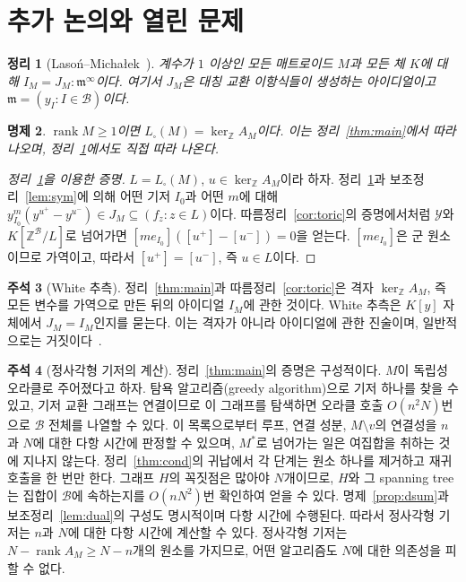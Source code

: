 \documentclass[11pt,a4paper]{article}
\newcommand{\lstroke}{{\lmfont ł}}
\theoremstyle{plain}
\newtheorem{theorem}{정리}[section]
\newtheorem{proposition}[theorem]{명제}
\theoremstyle{definition}
\newtheorem{remark}[theorem]{주석}
\newcommand{\Z}{\mathbb Z}
\newcommand{\AM}{A_M}
\newcommand{\kerZ}{\ker_{\Z}\!A_M}
\newcommand{\sq}{L_{\square}}
\newcommand{\bs}{\mathcal B}
\newcommand{\rank}{\operatorname{rank}}
\newcommand{\LM}{Lasoń--Micha\lstroke{}ek}
\begin{document}
\section{추가 논의와 열린 문제}\label{sec:caveats}
\begin{theorem}[\LM{}~\cite{LM14}]\label{thm:sat}
계수가 $1$ 이상인 모든 매트로이드 $M$과 모든 체 $K$에 대해 $I_M=J_M:\mathfrak m^\infty$이다. 여기서 $J_M$은 대칭 교환 이항식들이 생성하는 아이디얼이고 $\mathfrak m=(y_I:I\in\bs)$이다.
\end{theorem}

\begin{proposition}\label{prop:lattice}
$\rank M\ge1$이면 $\sq(M)=\kerZ$이다. 이는 정리~\ref{thm:main}에서 따라 나오며, 정리~\ref{thm:sat}에서도 직접 따라 나온다.
\end{proposition}
\begin{proof}[정리~\ref{thm:sat}을 이용한 증명]
$L=\sq(M)$, $u\in\kerZ$이라 하자. 정리~\ref{thm:sat}과 보조정리~\ref{lem:sym}에 의해 어떤 기저 $I_0$과 어떤 $m$에 대해 $y_{I_0}^{m}(y^{u^+}-y^{u^-})\in J_M\subseteq(f_z:z\in L)$이다. 따름정리~\ref{cor:toric}의 증명에서처럼 $\mathcal Y$와 $K[\Z^{\bs}/L]$로 넘어가면 $[me_{I_0}]([u^+]-[u^-])=0$을 얻는다. $[me_{I_0}]$은 군 원소이므로 가역이고, 따라서 $[u^+]=[u^-]$, 즉 $u\in L$이다.
\end{proof}

\begin{remark}[White 추측]\label{rem:white}
정리~\ref{thm:main}과 따름정리~\ref{cor:toric}은 격자 $\kerZ$, 즉 모든 변수를 가역으로 만든 뒤의 아이디얼 $I_M$에 관한 것이다. White 추측은 $K[y]$ 자체에서 $J_M=I_M$인지를 묻는다. 이는 격자가 아니라 아이디얼에 관한 진술이며, 일반적으로는 거짓이다~\cite{Lar26}.
\end{remark}

\begin{remark}[정사각형 기저의 계산]\label{rem:alg}
정리~\ref{thm:main}의 증명은 구성적이다. $M$이 독립성 오라클로 주어졌다고 하자. 탐욕 알고리즘(greedy algorithm)으로 기저 하나를 찾을 수 있고, 기저 교환 그래프는 연결이므로 이 그래프를 탐색하면 오라클 호출 $O(n^2N)$번으로 $\bs$ 전체를 나열할 수 있다. 이 목록으로부터 루프, 연결 성분, $M\setminus v$의 연결성을 $n$과 $N$에 대한 다항 시간에 판정할 수 있으며, $M^*$로 넘어가는 일은 여집합을 취하는 것에 지나지 않는다. 정리~\ref{thm:cond}의 귀납에서 각 단계는 원소 하나를 제거하고 재귀 호출을 한 번만 한다. 그래프 $H$의 꼭짓점은 많아야 $N$개이므로, $H$와 그 spanning tree는 집합이 $\bs$에 속하는지를 $O(nN^2)$번 확인하여 얻을 수 있다. 명제~\ref{prop:dsum}과 보조정리~\ref{lem:dual}의 구성도 명시적이며 다항 시간에 수행된다. 따라서 정사각형 기저는 $n$과 $N$에 대한 다항 시간에 계산할 수 있다. 정사각형 기저는 $N-\rank\AM\ge N-n$개의 원소를 가지므로, 어떤 알고리즘도 $N$에 대한 의존성을 피할 수 없다.
\end{remark}
\end{document}
